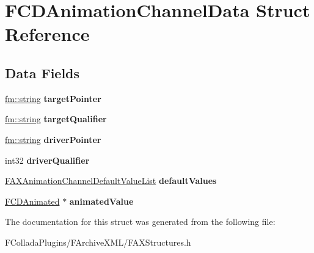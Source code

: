 \hypertarget{structFCDAnimationChannelData}{
\section{FCDAnimationChannelData Struct Reference}
\label{structFCDAnimationChannelData}
}
\subsection*{Data Fields}
\begin{DoxyCompactItemize}
\item 
\hypertarget{structFCDAnimationChannelData_ae58db047200461748e49df364fa99d4c}{
\hyperlink{classfm_1_1stringT}{fm::string} {\bfseries targetPointer}}
\label{structFCDAnimationChannelData_ae58db047200461748e49df364fa99d4c}

\item 
\hypertarget{structFCDAnimationChannelData_ac42bc46310e5107e40170c5d93157f17}{
\hyperlink{classfm_1_1stringT}{fm::string} {\bfseries targetQualifier}}
\label{structFCDAnimationChannelData_ac42bc46310e5107e40170c5d93157f17}

\item 
\hypertarget{structFCDAnimationChannelData_a05a48028de22e39af19697153c0e737d}{
\hyperlink{classfm_1_1stringT}{fm::string} {\bfseries driverPointer}}
\label{structFCDAnimationChannelData_a05a48028de22e39af19697153c0e737d}

\item 
\hypertarget{structFCDAnimationChannelData_aa19b04f8ef49296a457e28bca417010f}{
int32 {\bfseries driverQualifier}}
\label{structFCDAnimationChannelData_aa19b04f8ef49296a457e28bca417010f}

\item 
\hypertarget{structFCDAnimationChannelData_a6ab55632a777916da6e719ed42a0ce6e}{
\hyperlink{classfm_1_1vector}{FAXAnimationChannelDefaultValueList} {\bfseries defaultValues}}
\label{structFCDAnimationChannelData_a6ab55632a777916da6e719ed42a0ce6e}

\item 
\hypertarget{structFCDAnimationChannelData_a5f314c0134e767f51ac635fc5849a5df}{
\hyperlink{classFCDAnimated}{FCDAnimated} $\ast$ {\bfseries animatedValue}}
\label{structFCDAnimationChannelData_a5f314c0134e767f51ac635fc5849a5df}

\end{DoxyCompactItemize}


The documentation for this struct was generated from the following file:\begin{DoxyCompactItemize}
\item 
FColladaPlugins/FArchiveXML/FAXStructures.h\end{DoxyCompactItemize}
